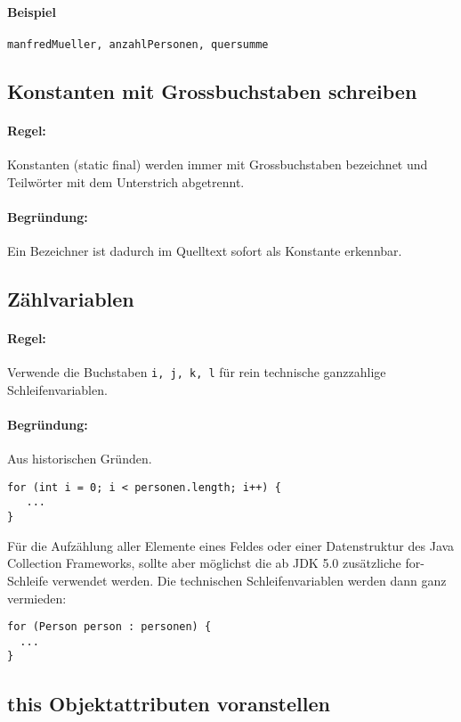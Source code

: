 \paragraph{Beispiel}
\texttt{manfredMueller, anzahlPersonen, quersumme}

\subsection{Konstanten mit Grossbuchstaben schreiben}

\paragraph{Regel:} Konstanten (static final) werden immer mit Grossbuchstaben bezeichnet und Teilwörter mit dem Unterstrich \textunderscore abgetrennt.
\paragraph{Begründung:} Ein Bezeichner ist dadurch im Quelltext sofort als Konstante erkennbar.

\subsection{Zählvariablen}

\paragraph{Regel:} Verwende die Buchstaben \texttt{i, j, k, l} für rein technische ganzzahlige Schleifenvariablen.
\paragraph{Begründung:} Aus historischen Gründen.

\begin{lstlisting}
for (int i = 0; i < personen.length; i++) {
   ... 
} 
\end{lstlisting}

Für die Aufzählung aller Elemente eines Feldes oder einer Datenstruktur des Java Collection Frameworks, sollte aber möglichst die ab JDK 5.0 zusätzliche for-Schleife verwendet werden. Die technischen Schleifenvariablen werden dann ganz vermieden:

\begin{lstlisting}
for (Person person : personen) {
  ...
}
\end{lstlisting}

\subsection{this Objektattributen voranstellen}

